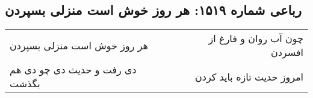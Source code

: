 \begin{center}
\section*{رباعی شماره ۱۵۱۹: هر روز خوش است منزلی بسپردن}
\label{sec:1519}
\begin{longtable}{l p{0.5cm} r}
هر روز خوش است منزلی بسپردن
&&
چون آب روان و فارغ از افسردن
\\
دی رفت و حدیث دی چو دی هم بگذشت
&&
امروز حدیث تازه باید کردن
\\
\end{longtable}
\end{center}
